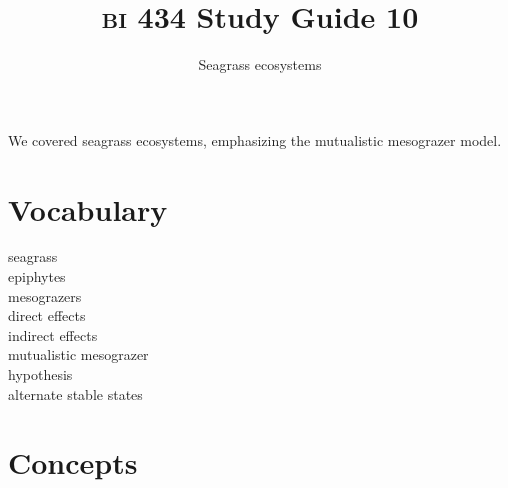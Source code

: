 \documentclass[letterpaper]{tufte-handout}
\title{{\scshape bi} 434 Study Guide 10}
\author{Seagrass ecosystems}
\date{} %
\begin{document}
\maketitle	%


We covered seagrass ecosystems, emphasizing the mutualistic mesograzer model.

\section*{Vocabulary}

\vspace{-1\baselineskip}
\begin{multicols}{2}
seagrass \\
epiphytes \\
mesograzers \\
direct effects \\
indirect effects \\
mutualistic mesograzer \\ \hspace*{1em}hypothesis \\
alternate stable states
\end{multicols}

\section*{Concepts}
\end{document}
